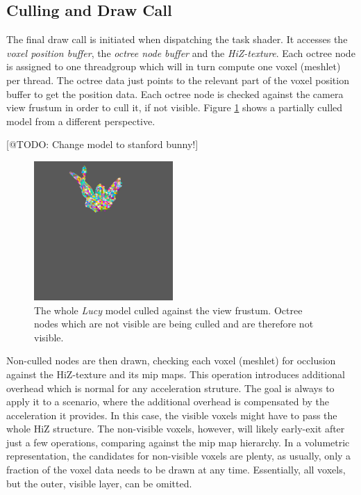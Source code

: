 \subsection*{Culling and Draw Call} \label{subsec-culling-and-draw-call}

The final draw call is initiated when dispatching the task shader. It accesses the \emph{voxel position buffer}, 
the \emph{octree node buffer} and the \emph{\ac{HiZ}-texture}. Each octree node is assigned to one threadgroup which will 
in turn compute one voxel (meshlet) per thread. The octree data just points to the relevant part of the voxel position buffer 
to get the position data. Each octree node is checked against the camera view frustum in order to cull it, if not visible.
Figure \ref{fig:lucy-frustum-culling} shows a partially culled model from a different perspective. 

[@TODO: Change model to stanford bunny!]
\begin{figure}[h]
    \centering
    \includegraphics[width=200px]{images/graphics/lucy-frustum-culling.jpg}
    \caption{The whole \emph{Lucy} model culled against the view frustum. Octree nodes which are not visible are being 
    culled and are therefore not visible.}
    \label{fig:lucy-frustum-culling}
\end{figure}


Non-culled nodes are then drawn, checking each voxel (meshlet) for occlusion against the \ac{HiZ}-texture and its mip maps. 
This operation introduces additional overhead which is normal for any acceleration struture. The goal is always to apply it 
to a scenario, where the additional overhead is compensated by the acceleration it provides. In this case, the visible voxels 
might have to pass the whole \ac{HiZ} structure. The non-visible voxels, however, will likely early-exit after just a few 
operations, comparing against the mip map hierarchy. In a volumetric representation, the candidates for non-visible voxels 
are plenty, as usually, only a fraction of the voxel data needs to be drawn at any time. Essentially, all voxels, but the 
outer, visible layer, can be omitted.\\

